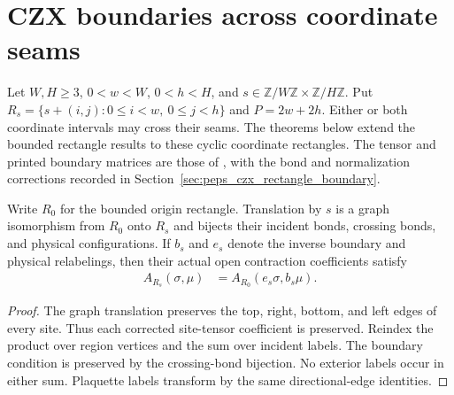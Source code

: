 \section{CZX boundaries across coordinate seams}%
\label{sec:czx_wrapping_rectangle}

Let $W,H\ge3$, $0<w<W$, $0<h<H$, and
$s\in\mathbb Z/W\mathbb Z\times\mathbb Z/H\mathbb Z$. Put
$R_s=\{s+(i,j):0\le i<w,\ 0\le j<h\}$ and $P=2w+2h$.
Either or both coordinate intervals may cross their seams. The theorems below
extend the bounded rectangle results to these cyclic coordinate rectangles.
The tensor and printed boundary matrices are those of
\cite[Appendix~A]{Cirac2021Matrix}, with the bond and normalization corrections
recorded in Section~\ref{sec:peps_czx_rectangle_boundary}.

\begin{lemma}%
    \label{lem:czx_wrapping_contraction}
    \leanok
    Write $R_0$ for the bounded origin rectangle. Translation by $s$ is a
    graph isomorphism from $R_0$ onto $R_s$ and bijects their incident bonds,
    crossing bonds, and physical configurations. If $b_s$ and $e_s$ denote
    the inverse boundary and physical relabelings, then their actual open
    contraction coefficients satisfy
    \begin{align}
        A_{R_s}(\sigma,\mu) & =A_{R_0}(e_s\sigma,b_s\mu).
        \label{eq:czx_wrapping_contraction}
    \end{align}
\end{lemma}
\begin{proof}\leanok
    The graph translation preserves the top, right, bottom, and left edges
    of every site. Thus each corrected site-tensor coefficient is preserved.
    Reindex the product over region vertices and the sum over incident labels.
    The boundary condition is preserved by the crossing-bond bijection.
    No exterior labels occur in either sum. Plaquette labels transform by
    the same directional-edge identities.
\end{proof}

